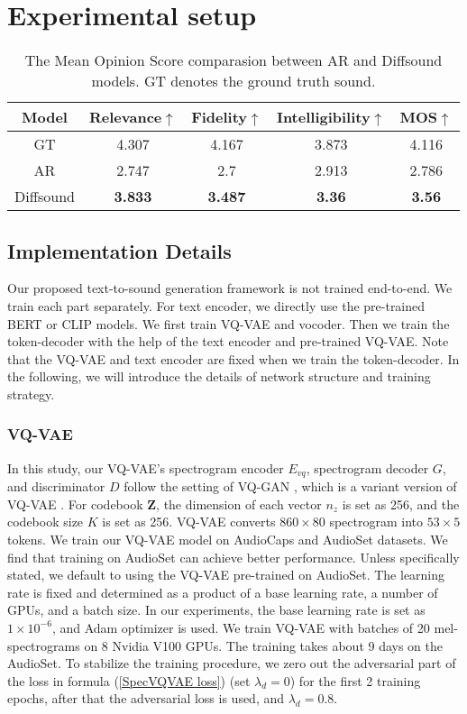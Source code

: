 \documentclass[lettersize,journal]{IEEEtran}
\begin{document}
\section{Experimental setup} \label{experimental setup}
\begin{table}[t] \centering
\caption{The Mean Opinion Score comparasion between AR and Diffsound models. GT denotes the ground truth sound.}
\label{tab:my-table1}
\begin{tabular}{ccccc}
\hline
Model     & Relevance$\uparrow$ & Fidelity$\uparrow$ & Intelligibility$\uparrow$ & MOS$\uparrow$   \\ \hline
GT        & 4.307     & 4.167    & 3.873           & 4.116 \\ \hline
AR        & 2.747     & 2.7      & 2.913           & 2.786 \\
Diffsound & \textbf{3.833}     & \textbf{3.487}    & \textbf{3.36}            & \textbf{3.56}  \\ \hline
\end{tabular}
\end{table}
\subsection{Implementation Details}
{\color{black}Our proposed text-to-sound generation framework is not trained end-to-end.} We train each part separately. For text encoder, we directly use the pre-trained BERT or CLIP models. We first train VQ-VAE and vocoder. Then we train the token-decoder with the help of the text encoder and pre-trained VQ-VAE. Note that the VQ-VAE and text encoder are fixed when we train the token-decoder. In the following, we will introduce the details of network structure and training strategy.
\subsubsection{VQ-VAE} In this study, our VQ-VAE's spectrogram encoder $E_{vq}$, spectrogram decoder $G$, and discriminator $D$ follow the setting of VQ-GAN \cite{esser2021taming,iashin2021taming}, which is a variant version of VQ-VAE \cite{van2017neural}. For codebook $\boldsymbol{Z}$, the dimension of each vector $n_z$ is set as 256, and the codebook size $K$ is set as 256. VQ-VAE converts $860 \times 80$ spectrogram into $53 \times 5$ tokens. We train our VQ-VAE model on AudioCaps and AudioSet datasets. We find that training on AudioSet can achieve better performance. Unless specifically stated, we default to using the VQ-VAE pre-trained on AudioSet. The learning rate is fixed and determined as a product of a base learning rate, a number of GPUs, and a batch size. In our experiments, the base learning rate is set as $1 \times 10^{-6}$, and Adam optimizer \cite{kingma2014adam} is used. We train VQ-VAE with batches of 20 mel-spectrograms on 8 Nvidia V100 GPUs. The training takes about 9 days on the AudioSet. To stabilize the training procedure, we zero out the adversarial part of the loss in formula (\ref{SpecVQVAE loss}) (set $\lambda_d=0$) for the first 2 training epochs, after that the adversarial loss is used, and $\lambda_d=0.8$. 
\end{document}
